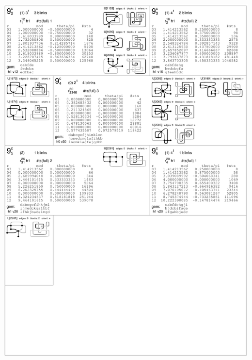 \begin{center}
 \includegraphics[height=23.5cm]{E.figsbw2/compcatalog003_bw.pdf} \eject
\end{center}